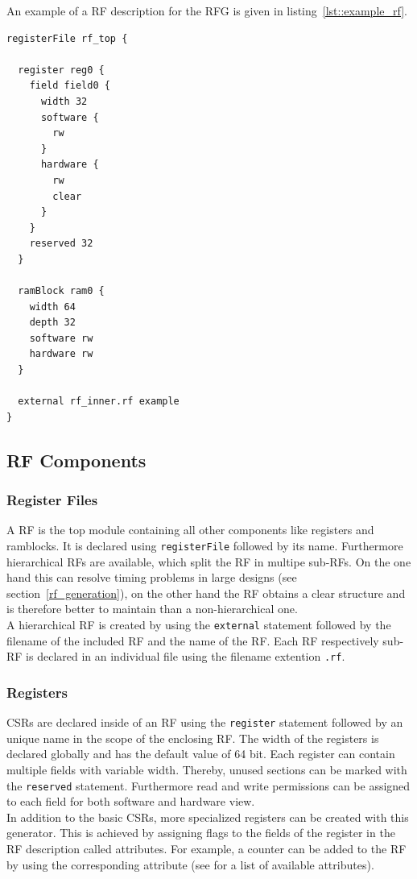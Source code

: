 An example of a RF description for the RFG is given in listing~\ref{lst::example_rf}.

\begin{lstlisting}[frame=single,
caption={Example RF description},
basicstyle=\small\ttfamily,
label={lst::example_rf}]
registerFile rf_top {

  register reg0 {
    field field0 {
      width 32
      software {
        rw
      }
      hardware {
        rw
        clear
      }
    }
    reserved 32
  }
	
  ramBlock ram0 {
    width 64
    depth 32
    software rw
    hardware rw
  }
	
  external rf_inner.rf example
}
\end{lstlisting}
\subsection{RF Components}
\subsubsection{Register Files}
A RF is the top module containing all other components like registers and ramblocks. It is declared using \lstinline$registerFile$ followed by its name.
Furthermore hierarchical RFs are available, which split the RF in multipe sub-RFs. On the one hand this can resolve timing problems in large designs (see section~\ref{rf_generation}), on the other hand the RF obtains a clear structure and is therefore better to maintain than a non-hierarchical one.\\
A hierarchical RF is created by using the \lstinline$external$ statement followed by the filename of the included RF and the name of the RF. Each RF respectively sub-RF is declared in an individual file using the filename extention \lstinline$.rf$.
\subsubsection{Registers}
CSRs are declared inside of an RF using the \lstinline$register$ statement followed by an unique name in the scope of the enclosing RF. The width of the registers is declared globally and has the default value of 64 bit. Each register can contain multiple fields with variable width. Thereby, unused sections can be marked with the \lstinline$reserved$ statement. Furthermore read and write permissions can be assigned to each field for both software and hardware view.\\
In addition to the basic CSRs, more specialized registers can be created with this generator. This is achieved by assigning flags to the fields of the register in the RF description called attributes. For example, a counter can be added to the RF by using the corresponding attribute (see \cite{rfg_spec} for a list of available attributes).
